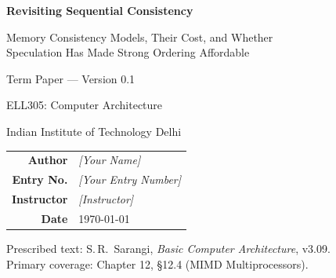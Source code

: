 \begin{titlepage}
\centering
\vspace*{2.5cm}

{\LARGE\bfseries Revisiting Sequential Consistency\par}
\vspace{0.6cm}
{\large Memory Consistency Models, Their Cost, and Whether\\
Speculation Has Made Strong Ordering Affordable\par}

\vspace{2.0cm}
{\large Term Paper --- Version 0.1\par}
\vspace{0.4cm}
{\large ELL305: Computer Architecture\par}
\vspace{0.3cm}
{\large Indian Institute of Technology Delhi\par}

\vspace{2.5cm}
\begin{tabular}{r@{\hskip 1em}l}
\textbf{Author}    & \textit{[Your Name]} \\[2pt]
\textbf{Entry No.} & \textit{[Your Entry Number]} \\[2pt]
\textbf{Instructor}& \textit{[Instructor]} \\[2pt]
\textbf{Date}      & \today \\
\end{tabular}

\vfill
{\small Prescribed text: S.\,R.~Sarangi, \emph{Basic Computer Architecture}, v3.09.\\
Primary coverage: Chapter 12, \S12.4 (MIMD Multiprocessors).\par}
\end{titlepage}
